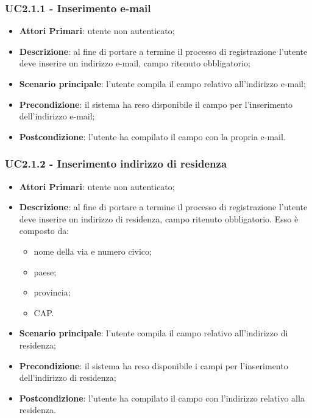 \subsubsection{UC2.1.1 - Inserimento e-mail}
\begin{itemize}
	\item \textbf{Attori Primari}: utente non autenticato;
	\item \textbf{Descrizione}: al fine di portare a termine il processo di registrazione l'utente deve inserire un indirizzo e-mail, campo ritenuto obbligatorio;
	\item \textbf{Scenario principale}: l'utente compila il campo relativo all'indirizzo e-mail;
	\item \textbf{Precondizione}: il sistema ha reso disponibile il campo per l'inserimento dell'indirizzo e-mail;
	\item \textbf{Postcondizione}: l'utente ha compilato il campo con la propria e-mail.
	
\end{itemize}
\subsubsection{UC2.1.2 - Inserimento indirizzo di residenza}
\begin{itemize}
	\item \textbf{Attori Primari}: utente non autenticato;
	\item \textbf{Descrizione}: al fine di portare a termine il processo di registrazione l'utente deve inserire un indirizzo di residenza, campo ritenuto obbligatorio. Esso è composto da: 
	\begin{itemize}
	\item nome della via e numero civico;
	\item paese;
	\item provincia;
	\item CAP.

	\end{itemize}
	\item \textbf{Scenario principale}: l'utente compila il campo relativo all'indirizzo di residenza;
	\item \textbf{Precondizione}: il sistema ha reso disponibile i campi per l'inserimento dell'indirizzo di residenza;
	\item \textbf{Postcondizione}: l'utente ha compilato il campo con l'indirizzo relativo alla residenza.
\end{itemize}
